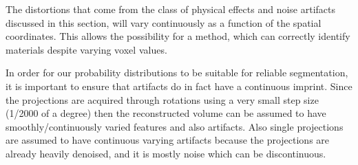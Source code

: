 The distortions that come from the class of physical effects and noise
artifacts discussed in this section, will vary continuously as a function of
the spatial coordinates. This allows the possibility for a method, which can
correctly identify materials despite varying voxel values.

In order for our probability distributions to be suitable for reliable
segmentation,  it is important to ensure that artifacts do in fact have a
continuous imprint.  Since the projections are acquired through rotations using
a very small step size (1/2000 of a degree) then the reconstructed volume can
be assumed to have smoothly/continuously varied features and also artifacts.
Also single projections are assumed to have continuous varying artifacts
because the projections are already heavily denoised, and it is mostly noise
which can be discontinuous.


